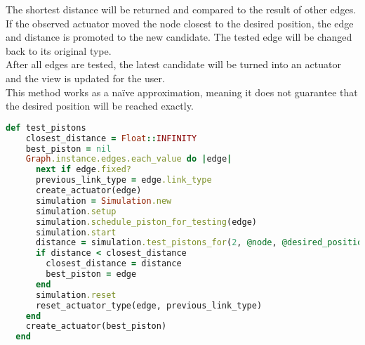 The shortest distance will be returned and compared to the result of other edges. If the observed actuator moved the node closest to the desired position, the edge and distance is promoted to the new candidate. The tested edge will be changed back to its original type.\\
After all edges are tested, the latest candidate will be turned into an actuator and the view is updated for the user.\\
This method works as a naïve approximation, meaning it does not guarantee that the desired position will be reached exactly.

\begin{lstlisting}[language=Ruby, label={lst:test_piston}, caption=The test\_piston method changes each edge into an actuator\, tests its movement and determines how close it brings a selected node to a desired position.]
  def test_pistons
    closest_distance = Float::INFINITY
    best_piston = nil
    Graph.instance.edges.each_value do |edge|
      next if edge.fixed?
      previous_link_type = edge.link_type
      create_actuator(edge)
      simulation = Simulation.new
      simulation.setup
      simulation.schedule_piston_for_testing(edge)
      simulation.start
      distance = simulation.test_pistons_for(2, @node, @desired_position)
      if distance < closest_distance
        closest_distance = distance
        best_piston = edge
      end
      simulation.reset
      reset_actuator_type(edge, previous_link_type)
    end
    create_actuator(best_piston)
  end
\end{lstlisting}

